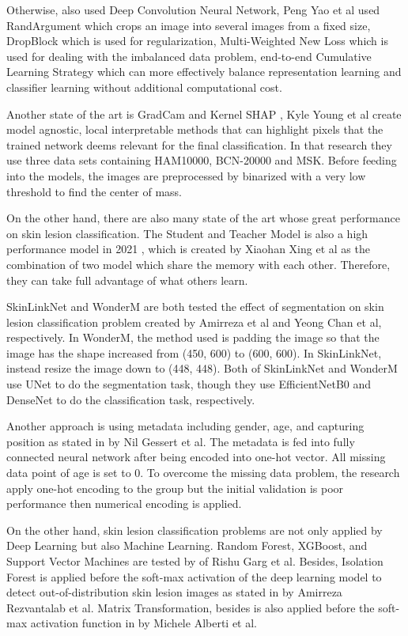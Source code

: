 \documentclass[sensors,article,submit,pdftex,moreauthors]{Definitions/mdpi}
\begin{document}
{		Otherwise, \mbox{\cite{01284}} also used Deep Convolution Neural Network, Peng Yao et al used RandArgument which crops an image into several images from a fixed size, DropBlock which is used for regularization, Multi-Weighted New Loss which is used for dealing with the imbalanced data problem, end-to-end Cumulative Learning Strategy which can more effectively balance representation learning and classifier learning without additional computational cost. 
		
		Another state of the art is GradCam and Kernel SHAP \mbox{\cite{06612}}, Kyle Young et al create model agnostic, local interpretable methods that can highlight pixels that the trained network deems relevant for the final classification. In that research they use three data sets containing HAM10000, BCN-20000 and MSK. Before feeding into the models, the images are preprocessed by binarized with a very low threshold to find the center of mass. 
		
		On the other hand, there are also many state of the art whose great performance on skin lesion classification. The Student and Teacher Model is also a high performance model in 2021 \mbox{\cite{03225}}, which is created by Xiaohan Xing et al as the combination of two model which share the memory with each other. Therefore, they can take full advantage of what others learn. 
		
		SkinLinkNet \mbox{\cite{12602}} and WonderM \mbox{\cite{03426}} are both tested the effect of segmentation on skin lesion classification problem created by Amirreza et al and Yeong Chan et al, respectively. In WonderM, the method used is padding the image so that the image has the shape increased from (450, 600) to (600, 600). In SkinLinkNet, instead resize the image down to (448, 448). Both of SkinLinkNet and WonderM use UNet to do the segmentation task, though they use EfficientNetB0 and DenseNet to do the classification task, respectively. 
		
		Another approach is using metadata including gender, age, and capturing position as stated in \mbox{\cite{03910}} by Nil Gessert et al. The metadata is fed into fully connected neural network after being encoded into one-hot vector. All missing data point of age is set to 0. To overcome the missing data problem, the research apply one-hot encoding to the group but the initial validation is poor performance then numerical encoding is applied.
		
		On the other hand, skin lesion classification problems are not only applied by Deep Learning but also Machine Learning. Random Forest, XGBoost, and Support Vector Machines are tested by \mbox{\cite{03798}} of Rishu Garg et al. Besides, Isolation Forest is applied before the soft-max activation of the deep learning model to detect out-of-distribution skin lesion images as stated in \mbox{\cite{10348}} by Amirreza Rezvantalab et al. Matrix Transformation, besides is also applied before the soft-max activation function in \mbox{\cite{05045}} by Michele Alberti et al.}
	
\end{document}
